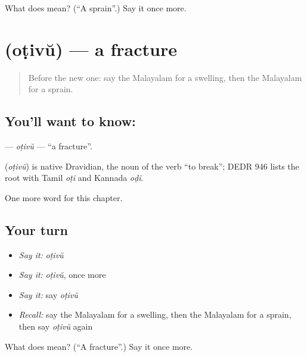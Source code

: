 \begin{tcolorbox}[breakable,colback=teal!4,colframe=teal!35!black,title={Before you move on}]
What does  mean? (\textquotedblleft{}A sprain\textquotedblright{}.) Say it once more.
\end{tcolorbox}
\section[\texorpdfstring{\ml{ഒടിവ്} (oṭivŭ)}{ഒടിവ് (oṭivŭ)}]{ (oṭivŭ) — a fracture}

\label{lesson:ML-C274-otivu}



\begin{quote}
Before the new one: say the Malayalam for a swelling, then the Malayalam for a sprain.
\end{quote}

\subsection*{You'll want to know: }
\textbf{} — \emph{oṭivŭ} — \textquotedblleft{}a fracture\textquotedblright{}.

\begin{cousinweb}
\textbf{} (\emph{oṭivŭ}) is native Dravidian, the noun of the verb \textquotedblleft{}to break\textquotedblright{}; DEDR 946 lists the root with Tamil \emph{oṭi} and Kannada \emph{oḍi}.
\end{cousinweb}

\begin{grammarlens}[title={What you've built}]
One more word for this chapter.
\end{grammarlens}

\subsection*{Your turn}
\begin{itemize}
\raggedright
  \item \emph{Say it:} \emph{oṭivŭ}
  \item \emph{Say it:} \emph{oṭivŭ}, once more
  \item \emph{Say it:} say \emph{oṭivŭ}
  \item \emph{Recall:} say the Malayalam for a swelling, then the Malayalam for a sprain, then say \emph{oṭivŭ} again
\end{itemize}

\begin{tcolorbox}[breakable,colback=teal!4,colframe=teal!35!black,title={Before you move on}]
What does  mean? (\textquotedblleft{}A fracture\textquotedblright{}.) Say it once more.
\end{tcolorbox}
